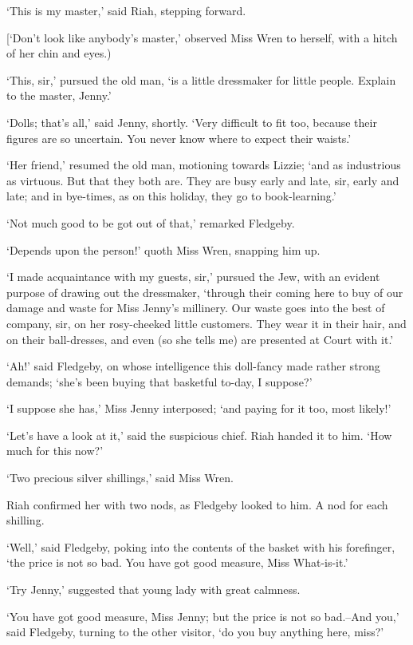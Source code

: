 ‘This is my master,’ said Riah, stepping forward.

[‘Don’t look like anybody’s master,’ observed Miss Wren to herself, with
a hitch of her chin and eyes.)

‘This, sir,’ pursued the old man, ‘is a little dressmaker for little
people. Explain to the master, Jenny.’

‘Dolls; that’s all,’ said Jenny, shortly. ‘Very difficult to fit too,
because their figures are so uncertain. You never know where to expect
their waists.’

‘Her friend,’ resumed the old man, motioning towards Lizzie; ‘and as
industrious as virtuous. But that they both are. They are busy early and
late, sir, early and late; and in bye-times, as on this holiday, they go
to book-learning.’

‘Not much good to be got out of that,’ remarked Fledgeby.

‘Depends upon the person!’ quoth Miss Wren, snapping him up.

‘I made acquaintance with my guests, sir,’ pursued the Jew, with an
evident purpose of drawing out the dressmaker, ‘through their coming
here to buy of our damage and waste for Miss Jenny’s millinery. Our
waste goes into the best of company, sir, on her rosy-cheeked little
customers. They wear it in their hair, and on their ball-dresses, and
even (so she tells me) are presented at Court with it.’

‘Ah!’ said Fledgeby, on whose intelligence this doll-fancy made rather
strong demands; ‘she’s been buying that basketful to-day, I suppose?’

‘I suppose she has,’ Miss Jenny interposed; ‘and paying for it too, most
likely!’

‘Let’s have a look at it,’ said the suspicious chief. Riah handed it to
him. ‘How much for this now?’

‘Two precious silver shillings,’ said Miss Wren.

Riah confirmed her with two nods, as Fledgeby looked to him. A nod for
each shilling.

‘Well,’ said Fledgeby, poking into the contents of the basket with his
forefinger, ‘the price is not so bad. You have got good measure, Miss
What-is-it.’

‘Try Jenny,’ suggested that young lady with great calmness.

‘You have got good measure, Miss Jenny; but the price is not so
bad.--And you,’ said Fledgeby, turning to the other visitor, ‘do you buy
anything here, miss?’

